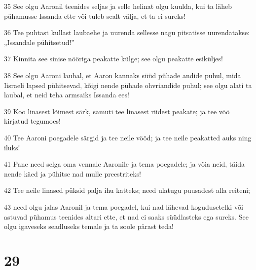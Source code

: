 \par 35 See olgu Aaronil teenides seljas ja selle helinat olgu kuulda, kui ta läheb pühamusse Issanda ette või tuleb sealt välja, et ta ei sureks!
\par 36 Tee puhtast kullast laubaehe ja uurenda sellesse nagu pitsatisse uurendatakse: „Issandale pühitsetud!”
\par 37 Kinnita see sinise nööriga peakatte külge; see olgu peakatte esiküljes!
\par 38 See olgu Aaroni laubal, et Aaron kannaks süüd pühade andide puhul, mida Iisraeli lapsed pühitsevad, kõigi nende pühade ohvriandide puhul; see olgu alati ta laubal, et neid teha armsaiks Issanda ees!
\par 39 Koo linasest lõimest särk, samuti tee linasest riidest peakate; ja tee vöö kirjatud tegumoes!
\par 40 Tee Aaroni poegadele särgid ja tee neile vööd; ja tee neile peakatted auks ning iluks!
\par 41 Pane need selga oma vennale Aaronile ja tema poegadele; ja võia neid, täida nende käed ja pühitse nad mulle preestriteks!
\par 42 Tee neile linased püksid palja ihu katteks; need ulatugu puusadest alla reiteni;
\par 43 need olgu jalas Aaronil ja tema poegadel, kui nad lähevad kogudusetelki või astuvad pühamus teenides altari ette, et nad ei saaks süüdlasteks ega sureks. See olgu igaveseks seadluseks temale ja ta soole pärast teda!

\chapter{29}


